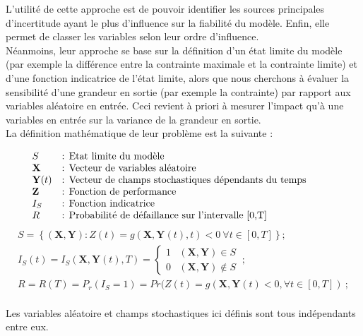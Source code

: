 \documentclass[a4paper,10pt]{article}
\begin{document}
L'utilité de cette approche est de pouvoir identifier les sources principales d'incertitude ayant le plus d'influence sur la fiabilité du modèle. Enfin, elle permet de classer les variables selon leur ordre d'influence. \\

Néanmoins, leur approche se base sur la définition d'un état limite du modèle (par exemple la différence entre la contrainte maximale et la contrainte limite) et d'une fonction indicatrice de l'état limite, alors que nous cherchons à évaluer la sensibilité d'une grandeur en sortie (par exemple la contrainte) par rapport aux variables aléatoire en entrée. Ceci revient à priori à mesurer l'impact qu'à une variables en entrée sur la variance de la grandeur en sortie. \\

La définition mathématique de leur problème est la suivante : 

   \[
      \begin{array}{lp{0.8\linewidth}}
         S             & : Etat limite du modèle \\
         \textbf{X}    & : Vecteur de variables aléatoire \\
         \textbf{Y}(t) & : Vecteur de champs stochastiques dépendants du temps \\
         \textbf{Z}    & : Fonction de performance \\
         I_S 	       & : Fonction indicatrice \\
         R  		   & : Probabilité de défaillance sur l'intervalle [0,T]
      \end{array}
   \]
   \begin{eqnarray}   
S = \left\lbrace \left( \textbf{X},\textbf{Y}\right) :Z(t)=g\left(\textbf{X},\textbf{Y}(t),t\right)<0\ \forall t \in\left[0,T \right] \right\rbrace ;\\
I_S(t) = I_S(\textbf{X},\textbf{Y}(t),T) = 
\begin{cases}
	1 &  (\textbf{X},\textbf{Y}) \in S \\ 
	0 &  (\textbf{X},\textbf{Y}) \not\in S
\end{cases}\ ;\\
R = R(T) = P_r(I_S=1) = Pr(Z(t) = g(\textbf{X},\textbf{Y}(t) < 0, \forall t \in \left[0,T\right]) \ ;
   \end{eqnarray}\\

Les variables aléatoire et champs stochastiques ici définis sont tous indépendants entre eux. \\
\end{document}
